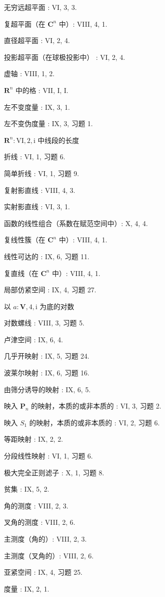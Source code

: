 无穷远超平面 : VI, 3, 3.

复超平面（在 \(\mathbf{C}^n\) 中）: VIII, 4, 1.

直径超平面 : VI, 2, 4.

投影超平面（在球极投影中） : VI, 2, 4.

虚轴 : VIII, 1, 2.

\(\mathbf{R}^n\) 中的格 : VII, I, I.

左不变度量 : IX, 3, 1.

左不变伪度量 : IX, 3, 习题 1.

\(\mathbf{R}^n:\mathrm{VI},2,\mathrm{i}\) 中线段的长度

折线 : VI, 1, 习题 6.

简单折线 : VI, 1, 习题 9.

复射影直线 : VIII, 4, 3.

实射影直线 : VI, 3, 1.

函数的线性组合（系数在赋范空间中）: X, 4, 4.

复线性簇（在 \(\mathbf{C}^n\) 中）: VIII, 4, 1.

线性可达的 : IX, 6, 习题 11.

复直线（在 \(\mathbf{C}^n\) 中）: VIII, 4, 1.

局部仿紧空间 : IX, 4, 习题 27.

以 \(a:\mathbf{V},4,\mathrm{i}\) 为底的对数

对数螺线 : VIII, 3, 习题 5.

卢津空间 : IX, 6, 4.

几乎开映射 : IX, 5, 习题 24.

波莱尔映射 : IX, 6, 习题 16.

由筛分诱导的映射 : IX, 6, 5.

映入 \(\mathbf{P}_n\) 的映射，本质的或非本质的 : VI, 3, 习题 2.

映入 \(S_{1}\) 的映射，本质的或非本质的 : VI, 2, 习题 6.

等距映射 : IX, 2, 2.

分段线性映射 : VI, 1, 习题 6.

极大完全正则滤子 : X, 1, 习题 8.

贫集 : IX, 5, 2.

角的测度 : VIII, 2, 3.

叉角的测度 : VIII, 2, 6.

主测度（角的）: VIII, 2, 3.

主测度（叉角的）: VIII, 2, 6.

亚紧空间 : IX, 4, 习题 25.

度量 : IX, 2, 1.

